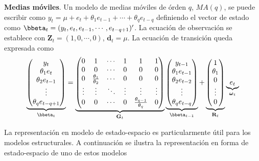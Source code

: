 \begin{Eje}
\textbf{Medias móviles}. Un modelo de medias móviles de órden $q$, $MA(q)$, se puede escribir como $y_t=\mu+e_t+\theta_1e_{t-1}+\cdots+\theta_qe_{t-q}$ definiendo el vector de estado como $\bbeta_t=(y_t,e_t,e_{t-1},\cdots,e_{t-q+1})'$. La ecuación de observación se establece con $\mathbf{Z}_t=(1,0,\cdots,0)$, $\mathbf{d}_t=\mu$. La ecuación de transición queda expresada como
\begin{equation*}
\underbrace{\begin{pmatrix}
y_t\\\theta_1e_{t}\\\theta_2e_{t-1}\\\vdots\\\theta_qe_{t-q+1}
\end{pmatrix}}_{\bbeta_t}=\underbrace{\begin{pmatrix}
0&1&\cdots&1&1&1\\
0&0&\cdots&0&0&0\\
0&\frac{\theta_1}{\theta_2}&\cdots&0&0&0\\
\vdots&\vdots&\ddots&\vdots&\vdots&\vdots\\
0&0&\cdots&0&\frac{\theta_{q-1}}{\theta_q}&0
\end{pmatrix}}_{\mathbf{G}_t}\underbrace{\begin{pmatrix}
y_{t-1}\\\theta_1e_{t-1}\\\theta_2e_{t-2}\\\vdots\\\theta_qe_{t-q}
\end{pmatrix}}_{\bbeta_{t-1}}+\underbrace{\begin{pmatrix}
1\\\theta_1\\0\\\vdots\\0
\end{pmatrix}}_{\mathbf{R}_t}\underbrace{e_t}_{\boldsymbol{\omega}_t}
\end{equation*}
\end{Eje}

La representación en modelo de estado-espacio es particularmente útil para los modelos estructurales. A continuación se ilustra la representación en forma de estado-espacio de uno de estos modelos

